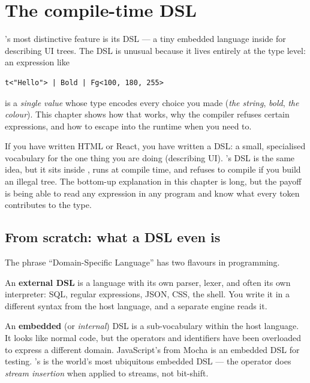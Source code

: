 \chapter{The compile-time DSL}
\label{ch:dsl}

\maya{}'s most distinctive feature is its DSL --- a tiny embedded
language inside \cpp{} for describing UI trees. The DSL is unusual
because it lives entirely at the type level: an expression like

\begin{lstlisting}
t<"Hello"> | Bold | Fg<100, 180, 255>
\end{lstlisting}

is a \emph{single value} whose type encodes every choice you made
(\emph{the string}, \emph{bold}, \emph{the colour}). This chapter
shows how that works, why the compiler refuses certain expressions,
and how to escape into the runtime when you need to.

\begin{aside}
If you have written HTML or React, you have written a DSL: a small,
specialised vocabulary for the one thing you are doing (describing
UI). \maya{}'s DSL is the same idea, but it sits inside \cpp{}, runs
at compile time, and refuses to compile if you build an illegal
tree. The bottom-up explanation in this chapter is long, but the
payoff is being able to read any expression in any \maya{} program
and know what every token contributes to the type.
\end{aside}

\section{From scratch: what a DSL even is}
\label{sec:dsl:what}

The phrase ``Domain-Specific Language'' has two flavours in
programming.

An \textbf{external DSL} is a language with its own parser, lexer,
and often its own interpreter: SQL, regular expressions, JSON, CSS,
the shell. You write it in a different syntax from the host
language, and a separate engine reads it.

An \textbf{embedded} (or \emph{internal}) DSL is a sub-vocabulary
within the host language. It looks like normal code, but the
operators and identifiers have been overloaded to express a different
domain. JavaScript's  from
Mocha is an embedded DSL for testing. \cpp{}'s  is the world's most ubiquitous embedded DSL --- the \code{<<}
operator does \emph{stream insertion} when applied to streams, not
bit-shift.

